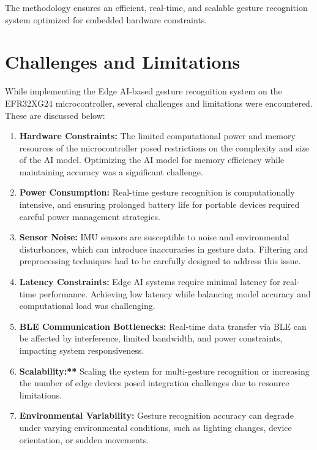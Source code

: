 \documentclass[
  9pt,
  letterpaper,
  abstract,
  titlepage]{scrbook}
\begin{document}
The methodology ensures an efficient, real-time, and scalable gesture
recognition system optimized for embedded hardware constraints.

\section{Challenges and Limitations}\label{sec:challenges}

While implementing the Edge AI-based gesture recognition system on the
EFR32XG24 microcontroller, several challenges and limitations were
encountered. These are discussed below:

\begin{enumerate}
\def\labelenumi{\arabic{enumi}.}
\item
  \textbf{Hardware Constraints:} The limited computational power and
  memory resources of the microcontroller posed restrictions on the
  complexity and size of the AI model. Optimizing the AI model for
  memory efficiency while maintaining accuracy was a significant
  challenge.
\item
  \textbf{Power Consumption:} Real-time gesture recognition is
  computationally intensive, and ensuring prolonged battery life for
  portable devices required careful power management strategies.
\item
  \textbf{Sensor Noise:} IMU sensors are susceptible to noise and
  environmental disturbances, which can introduce inaccuracies in
  gesture data. Filtering and preprocessing techniques had to be
  carefully designed to address this issue.
\item
  \textbf{Latency Constraints:} Edge AI systems require minimal latency
  for real-time performance. Achieving low latency while balancing model
  accuracy and computational load was challenging.
\item
  \textbf{BLE Communication Bottlenecks:} Real-time data transfer via
  BLE can be affected by interference, limited bandwidth, and power
  constraints, impacting system responsiveness.
\item
  \textbf{Scalability:**} Scaling the system for multi-gesture
  recognition or increasing the number of edge devices posed integration
  challenges due to resource limitations.
\item
  \textbf{Environmental Variability:} Gesture recognition accuracy can
  degrade under varying environmental conditions, such as lighting
  changes, device orientation, or sudden movements.
\end{enumerate}
\end{document}
